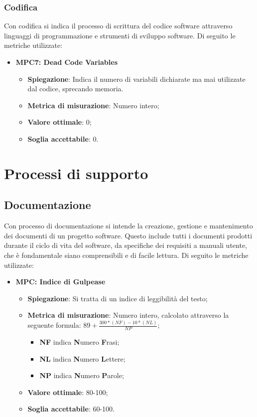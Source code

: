 \subsubsection{Codifica}
Con codifica si indica il processo di scrittura del codice software attraverso linguaggi di programmazione e strumenti di sviluppo software. Di seguito le metriche utilizzate:
\begin{itemize}
    \item \textbf{MPC7: Dead Code Variables}
    \begin{itemize}
        \item \textbf{Spiegazione}: Indica il numero di variabili dichiarate ma mai utilizzate dal codice, sprecando memoria.
        \item \textbf{Metrica di misurazione}: Numero intero;
        \item \textbf{Valore ottimale}: 0;
        \item \textbf{Soglia accettabile}: 0.
    \end{itemize}
\end{itemize}


\section{Processi di supporto}


\subsection{Documentazione}
Con processo di documentazione si intende la creazione, gestione e mantenimento dei documenti di un progetto software. Questo include tutti i documenti prodotti durante il ciclo di vita del software, da specifiche dei requisiti a manuali utente, che è fondamentale siano comprensibili e di facile lettura. Di seguito le metriche utilizzate:
\begin{itemize}
    \item \textbf{MPC: Indice di Gulpease}
    \begin{itemize}
        \item \textbf{Spiegazione}: Si tratta di un indice di leggibilità del testo;
        \item \textbf{Metrica di misurazione}: Numero intero, calcolato attraverso la seguente formula: \textbf{$89 + \frac{300*(NF)-10*(NL)}{NP}$};
            \begin{itemize}
                \item \textbf{NF} indica \textbf{N}umero \textbf{F}rasi;
                \item \textbf{NL} indica \textbf{N}umero \textbf{L}ettere;
                \item \textbf{NP} indica \textbf{N}umero \textbf{P}arole;
            \end{itemize}
        \item \textbf{Valore ottimale}: 80-100;
        \item \textbf{Soglia accettabile}: 60-100.
    \end{itemize}
\end{itemize}

